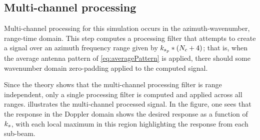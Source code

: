 \subsection{Multi-channel processing}
Multi-channel processing for this simulation occurs in the azimuth-wavenumber, range-time domain. This step computes a processing filter that attempts to create a signal over an azimuth frequency range given by $k_{s_p}*(N_c + 4)$; that is, when the average antenna pattern of \eqref{eq:averagePattern} is applied, there should some wavenumber domain zero-padding applied to the computed signal.
\par
Since the theory shows that the multi-channel processing filter is range independent, only a single processing filter is computed and applied across all ranges.  illustrates the multi-channel processed signal. In the figure, one sees that the response in the Doppler domain shows the desired response as a function of $k_{s}$, with each local maximum in this region highlighting the response from each sub-beam.
